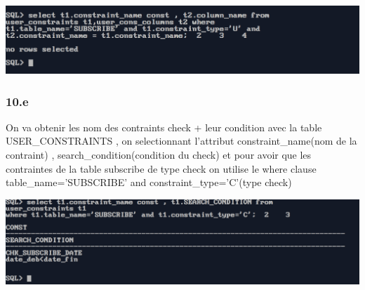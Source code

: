 

\begin{center}
    \includegraphics[width=\textwidth]{ScreenShot/Partie5/uni.png}
\end{center}

\subsubsection*{10.e}
On va obtenir les nom des contraints check + leur condition avec la table
USER\_CONSTRAINTS , on selectionnant l'attribut constraint\_name(nom de la contraint) ,
search\_condition(condition du check) et pour avoir que les contraintes de la table subscribe de type check
on utilise le where clause table\_name='SUBSCRIBE' and constraint\_type='C'(type check)



\begin{center}
    \includegraphics[width=\textwidth]{ScreenShot/Partie5/chk.png}
\end{center}





